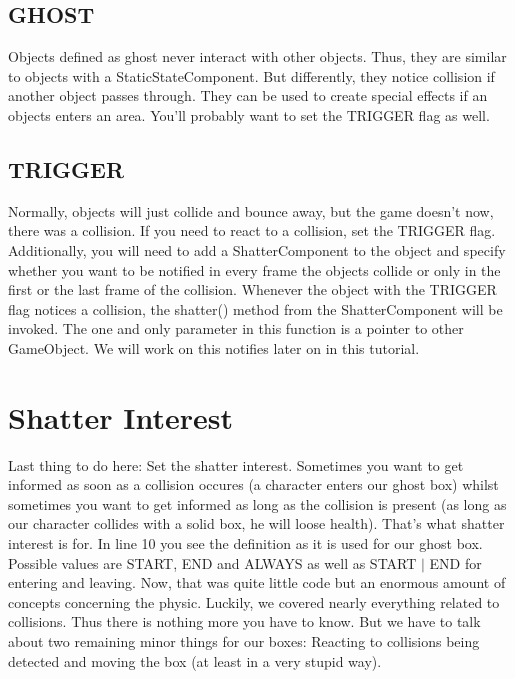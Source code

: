 \documentclass{article}
\begin{document}
\subsection{GHOST}

Objects defined as ghost never interact with other objects. Thus, they are similar to objects with a StaticStateComponent. But differently, they notice collision if another object passes through. They can be used to create special effects if an objects enters an area. You'll probably want to set the TRIGGER flag as well.

\subsection{TRIGGER}

Normally, objects will just collide and bounce away, but the game doesn't now, there was a collision. If you need to react to a collision, set the TRIGGER flag. Additionally, you will need to add a ShatterComponent to the object and specify whether you want to be notified in every frame the objects collide or only in the first or the last frame of the collision. Whenever the object with the TRIGGER flag notices a collision, the shatter() method from the ShatterComponent will be invoked. The one and only parameter in this function is a pointer to other GameObject. We will work on this notifies later on in this tutorial.

\section{Shatter Interest}

Last thing to do here: Set the shatter interest. Sometimes you want to get informed as soon as a collision occures (a character enters our ghost box) whilst sometimes you want to get informed as long as the collision is present (as long as our character collides with a solid box, he will loose health). That's what shatter interest is for. In line 10 you see the definition as it is used for our ghost box. Possible values are START, END and ALWAYS as well as START $|$ END for entering and leaving.\newline
Now, that was quite little code but an enormous amount of concepts concerning the physic. Luckily, we covered nearly everything related to collisions. Thus there is nothing more you have to know. But we have to talk about two remaining minor things for our boxes: Reacting to collisions being detected and moving the box (at least in a very stupid way).
\end{document}
